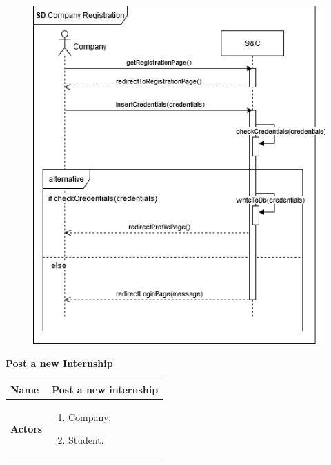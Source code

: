 \begin{enumerate}[label=\textbf{[US\arabic*]}, left = 0pt, align = left, resume]
            \newpage
            \begin{figure}[h!]
                \centering  \includegraphics[width=1\textwidth]{RASD/Images/UseCases/US08_CompanyRegistration.drawio.png}
                \label{fig:CompanyRegistration}
            \end{figure}

            \newpage
            \item \textbf{Post a new Internship}
            
            \begin{longtable}{|l|p{11cm}|}  
                \hline
                \textbf{Name} & 
                    \textbf{Post a new internship} \\
                \hline
                
                \textbf{Actors} & 
                    \begin{enumerate}[label=\textbullet, itemsep=0em]
                        \item Company;
                        \item Student.
                    \end{enumerate} \\
                \hline
                

\end{longtable}
\end{enumerate}
